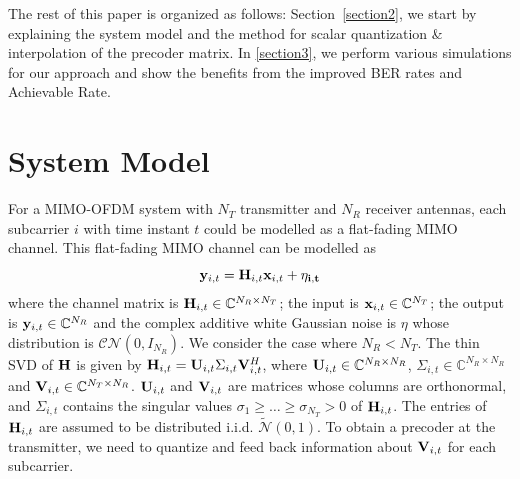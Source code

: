\documentclass[conference]{IEEEtran}
\begin{document}
The rest of this paper is organized as follows: Section~\ref{section2}, we start by explaining the system model and the method for scalar quantization \& interpolation of the precoder matrix. In \ref{section3}, we perform various simulations for our approach and show the benefits from the improved BER rates and Achievable Rate.



\section{System Model}
For a MIMO-OFDM system with $N_T$ transmitter and $N_R$ receiver
antennas, each subcarrier $i$ with time instant $t$ could be modelled as a flat-fading MIMO channel. This flat-fading MIMO channel can be modelled as
\label{section2}
\begin{equation}
{\bf y}_{i,t} = {\bf H}_{i,t} {\bf x}_{i,t}+ \bf{\eta_{i,t}}
\end{equation}
where the channel matrix is
${\bf H}_{i,t} \in \mathbb{C}^{N_R \times N_T}$; the input is
${\bf x}_{i,t} \in \mathbb{C}^{N_T}$; the output is
${\bf y}_{i,t} \in \mathbb{C}^{N_R}$ and the complex additive white
Gaussian noise is $\eta$ whose distribution is
${\mathcal{CN}}(0,I_{N_R})$. We consider the case where $N_R <
N_T$. The thin SVD of ${\bf H}$ is given by
${\bf H}_{i,t} = {\bf U}_{i,t} \Sigma_{i,t} {\bf V}_{i,t}^{H}$, where
${\bf U}_{i,t} \in \mathbb{C}^{N_R \times N_R}$,
$\Sigma_{i,t} \in \mathbb{C}^{N_R \times N_R}$ and
${\bf V}_{i,t} \in \mathbb{C}^{N_T \times N_R}$. ${\bf U}_{i,t}$ and
${\bf V}_{i,t}$ are matrices whose columns are orthonormal, and
$\Sigma_{i,t}$ contains the singular values
$\sigma_1 \geq \ldots \geq \sigma_{N_T} > 0$ of ${\bf H}_{i,t}$. The
entries of ${\bf H}_{i,t}$ are assumed to be distributed
i.i.d. $\tilde{\mathcal{N}}(0,1)$. To obtain a precoder at the
transmitter, we need to quantize and feed back information about
${\bf V}_{i,t}$ for each subcarrier.
\end{document}
